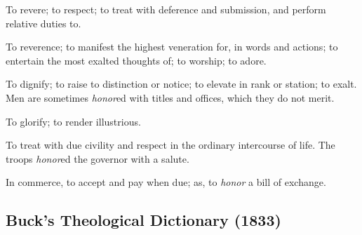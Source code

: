 		\begin{compactitem}
			\item[1] To revere; to respect; to treat with deference and submission, and perform relative duties to.
			\item[2] To reverence; to manifest the highest veneration for, in words and actions; to entertain the most exalted thoughts of; to worship; to adore.
			\item[3] To dignify; to raise to distinction or notice; to elevate in rank or station; to exalt. Men are sometimes \textit{honor}ed with titles and offices, which they do not merit.
			\item[4] To glorify; to render illustrious.
			\item[5] To treat with due civility and respect in the ordinary intercourse of life. The troops \textit{honor}ed the governor with a salute.
			\item[6] In commerce, to accept and pay when due; as, to \textit{honor} a bill of exchange.
		\end{compactitem}


	
\subsection{Buck's Theological Dictionary (1833)} %
	\label{HONOR-BTD}

